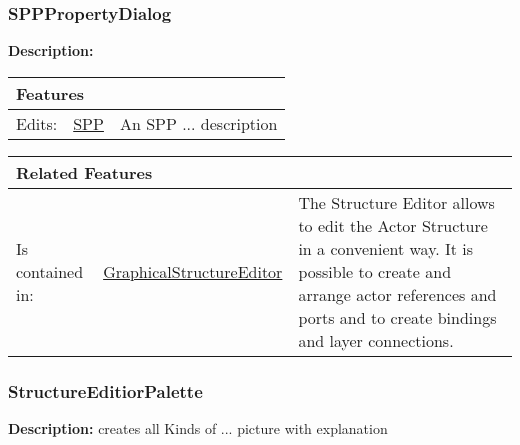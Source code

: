 			
			
		\vspace{\baselineskip}
		\vspace{\baselineskip}
		\vspace{\baselineskip}
		
		\subsubsection{\huge SPPPropertyDialog}
			\hypertarget{ref:SPPPropertyDialog}{}
			
			\textbf{Description:} 
			
			
			\begingroup
			\renewcommand{\arraystretch}{1.8} %
			\begin{longtable}{p{2.5cm}|p{4cm} p{}}
				\multicolumn{2}{l}{\textbf{\large Features}} & \\
				\hline
			Edits: & \tabitem \hyperlink{ref:SPP}{SPP}  & An SPP ... description\\
			\hline
			\end{longtable}
			\endgroup
			
			\begingroup
			\renewcommand{\arraystretch}{1.8} %
			\begin{longtable}{p{2.5cm}|p{4cm} p{}}
				\multicolumn{2}{l}{\textbf{\large Related Features}} & \\
				\hline
			Is contained in: & \tabitem \hyperlink{ref:GraphicalStructureEditor}{GraphicalStructureEditor}  & The Structure Editor allows to edit the Actor Structure in a convenient way. It is possible to create and arrange actor references and ports and to create bindings and layer connections.\\
			\hline
			\end{longtable}
			\endgroup
			
			
			
		\vspace{\baselineskip}
		\vspace{\baselineskip}
		\vspace{\baselineskip}
		
		\subsubsection{\huge StructureEditiorPalette}
			\hypertarget{ref:StructureEditiorPalette}{}
			
			\textbf{Description:} creates all Kinds of ...  picture with explanation
			
